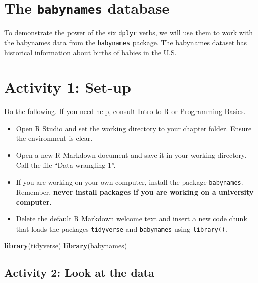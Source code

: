 \documentclass[]{book}
\newenvironment{Shaded}{\begin{snugshade}}{\end{snugshade}}
\newcommand{\KeywordTok}[1]{\textcolor[rgb]{0.13,0.29,0.53}{\textbf{#1}}}
\newcommand{\NormalTok}[1]{#1}
\providecommand{\tightlist}{%
  \setlength{\itemsep}{0pt}\setlength{\parskip}{0pt}}
\begin{document}
\hypertarget{the-babynames-database}{%
\section{\texorpdfstring{The \texttt{babynames} database}{The babynames database}}\label{the-babynames-database}}

To demonstrate the power of the six \texttt{dplyr} verbs, we will use them to work with the babynames data from the \texttt{babynames} package. The babynames dataset has historical information about births of babies in the U.S.

\hypertarget{activity-1-set-up-1}{%
\section{Activity 1: Set-up}\label{activity-1-set-up-1}}

Do the following. If you need help, consult Intro to R or Programming Basics.

\begin{itemize}
\tightlist
\item
  Open R Studio and set the working directory to your chapter folder. Ensure the environment is clear.\\
\item
  Open a new R Markdown document and save it in your working directory. Call the file ``Data wrangling 1''.\\
\item
  If you are working on your own computer, install the package \texttt{babynames}. Remember, \textbf{never install packages if you are working on a university computer}.
\item
  Delete the default R Markdown welcome text and insert a new code chunk that loads the packages \texttt{tidyverse} and \texttt{babynames} using \texttt{library()}.
\end{itemize}

\begin{Shaded}
\begin{Highlighting}[]
\KeywordTok{library}\NormalTok{(tidyverse)}
\KeywordTok{library}\NormalTok{(babynames)}
\end{Highlighting}
\end{Shaded}

\hypertarget{activity-2-look-at-the-data}{%
\subsection{Activity 2: Look at the data}\label{activity-2-look-at-the-data}}
\end{document}
